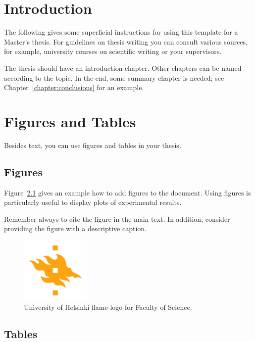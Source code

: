 \chapter{Introduction}

The following gives some superficial instructions for using this template for a Master's thesis. For guidelines on thesis writing you can consult various sources, for example, university courses on scientific writing or your supervisors.

The thesis should have an introduction chapter. Other chapters can be named according to the topic. In the end, some summary chapter is needed; see Chapter~\ref{chapter:conclusions} for an example.

\chapter{Figures and Tables}

Besides text, you can use figures and tables in your thesis.

\section{Figures}
Figure~\ref{fig:logo} gives an example how to add figures to the document. 
%
Using figures is particularly useful to display plots of experimental results.

Remember always to cite the figure in the main text. In addition, consider providing the figure with a descriptive caption.

\begin{figure}[h!] 
\begin{center}
\includegraphics[width=0.3\textwidth]{HY-logo-ml.png}
\caption{University of Helsinki flame-logo for Faculty of Science.\label{fig:logo}}
\end{center}
\end{figure}

\section{Tables}

